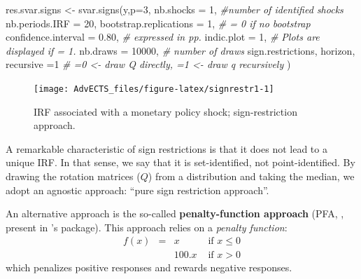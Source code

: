 \documentclass[
]{book}
\newenvironment{Shaded}{\begin{snugshade}}{\end{snugshade}}
\newcommand{\AttributeTok}[1]{\textcolor[rgb]{0.77,0.63,0.00}{#1}}
\newcommand{\CommentTok}[1]{\textcolor[rgb]{0.56,0.35,0.01}{\textit{#1}}}
\newcommand{\DecValTok}[1]{\textcolor[rgb]{0.00,0.00,0.81}{#1}}
\newcommand{\FloatTok}[1]{\textcolor[rgb]{0.00,0.00,0.81}{#1}}
\newcommand{\FunctionTok}[1]{\textcolor[rgb]{0.00,0.00,0.00}{#1}}
\newcommand{\NormalTok}[1]{#1}
\newcommand{\OtherTok}[1]{\textcolor[rgb]{0.56,0.35,0.01}{#1}}
\newcommand{\SpecialCharTok}[1]{\textcolor[rgb]{0.00,0.00,0.00}{#1}}
\theoremstyle{definition}
\theoremstyle{definition}
\theoremstyle{definition}
\theoremstyle{definition}
\theoremstyle{remark}
\begin{document}
\begin{Shaded}
\begin{Highlighting}[]
\NormalTok{res.svar.signs }\OtherTok{\textless{}{-}} \FunctionTok{svar.signs}\NormalTok{(y,}\AttributeTok{p=}\DecValTok{3}\NormalTok{,}
                             \AttributeTok{nb.shocks =} \DecValTok{1}\NormalTok{, }\CommentTok{\#number of identified shocks}
                             \AttributeTok{nb.periods.IRF =} \DecValTok{20}\NormalTok{,}
                             \AttributeTok{bootstrap.replications =} \DecValTok{1}\NormalTok{, }\CommentTok{\# = 0 if no bootstrap}
                             \AttributeTok{confidence.interval =} \FloatTok{0.80}\NormalTok{, }\CommentTok{\# expressed in pp.}
                             \AttributeTok{indic.plot =} \DecValTok{1}\NormalTok{, }\CommentTok{\# Plots are displayed if = 1.}
                             \AttributeTok{nb.draws =} \DecValTok{10000}\NormalTok{, }\CommentTok{\# number of draws}
\NormalTok{                             sign.restrictions,}
\NormalTok{                             horizon,}
                             \AttributeTok{recursive =}\DecValTok{1} \CommentTok{\#  =0 \textless{}{-} draw Q directly, =1 \textless{}{-} draw q recursively}
\NormalTok{)}
\end{Highlighting}
\end{Shaded}

\begin{figure}
\texttt{[image: AdvECTS\_files/figure-latex/signrestr1-1]} \caption{IRF associated with a monetary policy shock; sign-restriction approach.}\label{fig:signrestr1}
\end{figure}

\begin{Shaded}
\end{Shaded}

A remarkable characteristic of sign restrictions is that it does not lead to a unique IRF. In that sense, we say that it is set-identified, not point-identified. By drawing the rotation matrices (\(Q\)) from a distribution and taking the median, we adopt an agnostic approach: ``pure sign restriction approach''.

An alternative approach is the so-called \textbf{penalty-function approach} (PFA, \citet{Uhlig_2005}, present in \citet{Danne_2015}'s package). This approach relies on a \emph{penalty function}:
\[
\begin{array}{llll}f(x)&=&x&\text{ if }x\le0\\
&&100.x&\text{ if }x>0\end{array}
\]
which penalizes positive responses and rewards negative responses.
\end{document}
